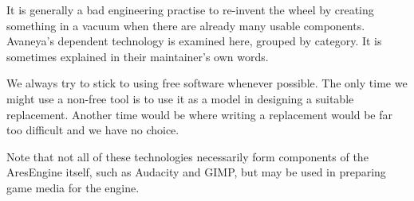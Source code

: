 

It is generally a bad engineering practise to re-invent the wheel by creating something in a vacuum when there are already many usable components. Avaneya's dependent technology is examined here, grouped by category. It is sometimes explained in their maintainer's own words.

We always try to stick to using free software whenever possible. The only time we might use a non-free tool is to use it as a model in designing a suitable replacement. Another time would be where writing a replacement would be far too difficult and we have no choice.

Note that not all of these technologies necessarily form components of the AresEngine itself, such as Audacity and GIMP, but may be used in preparing game media for the engine.













\StopChapter

